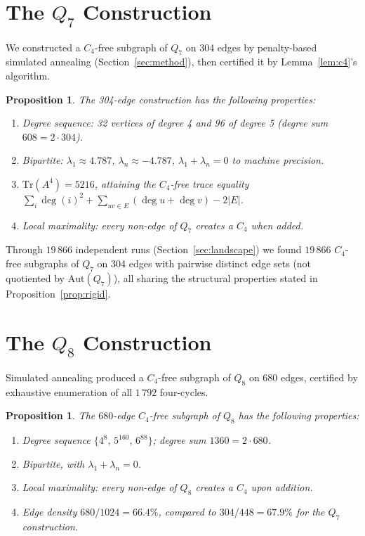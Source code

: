 \documentclass[12pt,a4paper]{article}
\newtheorem{proposition}[theorem]{Proposition}
\theoremstyle{definition}
\begin{document}
\section{The $Q_7$ Construction}\label{sec:q7}

We constructed a $C_4$-free subgraph of $Q_7$ on 304 edges by
penalty-based simulated annealing (Section~\ref{sec:method}),
then certified it by Lemma~\ref{lem:c4}'s algorithm.

\begin{proposition}\label{prop:q7}
The 304-edge construction has the following properties:
\begin{enumerate}[label=(\roman*)]
  \item Degree sequence: 32 vertices of degree 4 and 96 of degree 5
    (degree sum $608=2\cdot304$).
  \item Bipartite: $\lambda_1\approx4.787$, $\lambda_n\approx-4.787$,
    $\lambda_1+\lambda_n=0$ to machine precision.
  \item $\mathrm{Tr}(A^4)=5216$, attaining the $C_4$-free trace equality
    $\sum_i\deg(i)^2+\sum_{uv\in E}(\deg u+\deg v)-2|E|$.
  \item Local maximality: every non-edge of $Q_7$ creates a $C_4$ when added.
\end{enumerate}
\end{proposition}

Through $19\,866$ independent runs (Section~\ref{sec:landscape})
we found $19\,866$ $C_4$-free subgraphs of $Q_7$ on 304 edges with
pairwise distinct edge sets (not quotiented by $\mathrm{Aut}(Q_7)$),
all sharing the structural properties stated in Proposition~\ref{prop:rigid}.

\section{The $Q_8$ Construction}\label{sec:q8}

Simulated annealing produced a $C_4$-free subgraph of $Q_8$ on 680 edges,
certified by exhaustive enumeration of all $1\,792$ four-cycles.

\begin{proposition}\label{prop:q8struct}
The $680$-edge $C_4$-free subgraph of $Q_8$ has the following properties:
\begin{enumerate}[label=(\roman*)]
  \item Degree sequence $\{4^8,\,5^{160},\,6^{88}\}$; degree sum $1360=2\cdot680$.
  \item Bipartite, with $\lambda_1+\lambda_n=0$.
  \item Local maximality: every non-edge of $Q_8$ creates a $C_4$ upon addition.
  \item Edge density $680/1024=66.4\%$, compared to $304/448=67.9\%$
    for the $Q_7$ construction.
\end{enumerate}
\end{proposition}
\end{document}
